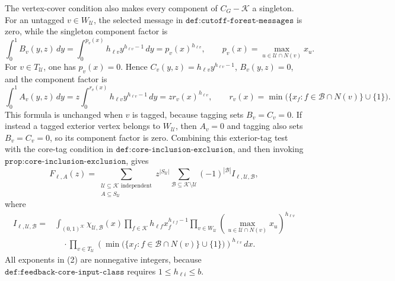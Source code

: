 The vertex-cover condition also makes every component of \(C_G-\mathcal K\) a singleton.  For an untagged \(v\in W_{\mathcal U}\), the selected message in \(\texttt{def:cutoff-forest-messages}\) is zero, while the singleton component factor is
\[
 \int_0^1 B_v(y,z)\,dy
 =\int_0^{p_v(x)}h_{\ell v}y^{h_{\ell v}-1}\,dy
 =p_v(x)^{h_{\ell v}},
 \qquad
 p_v(x)=\max_{u\in\mathcal U\cap N(v)}x_u.
\]
For \(v\in T_{\mathcal U}\), one has \(p_v(x)=0\).  Hence \(C_v(y,z)=h_{\ell v}y^{h_{\ell v}-1}\), \(B_v(y,z)=0\), and the component factor is
\[
 \int_0^1 A_v(y,z)\,dy
 =z\int_0^{r_v(x)}h_{\ell v}y^{h_{\ell v}-1}\,dy
 =z r_v(x)^{h_{\ell v}},
 \qquad
 r_v(x)=\min\bigl(\{x_f:f\in\mathcal B\cap N(v)\}\cup\{1\}\bigr).
\]
This formula is unchanged when \(v\) is tagged, because tagging sets \(B_v=C_v=0\).  If instead a tagged exterior vertex belongs to \(W_{\mathcal U}\), then \(A_v=0\) and tagging also sets \(B_v=C_v=0\), so its component factor is zero.  Combining this exterior-tag test with the core-tag condition in \(\texttt{def:core-inclusion-exclusion}\), and then invoking \(\texttt{prop:core-inclusion-exclusion}\), gives
\[
 F_{\ell,A}(z)
 =\sum_{\substack{\mathcal U\subseteq\mathcal K\text{ independent}\\ A\subseteq S_{\mathcal U}}}
 z^{|S_{\mathcal U}|}
 \sum_{\mathcal B\subseteq\mathcal K\setminus\mathcal U}
 (-1)^{|\mathcal B|} I_{\ell,\mathcal U,\mathcal B},                         \tag{1}
\]
where
\[
\begin{split}
 I_{\ell,\mathcal U,\mathcal B}
 ={}&\int_{(0,1)^{\mathcal K}}
 \chi_{\mathcal U,\mathcal B}(x)
 \prod_{f\in\mathcal K}h_{\ell f}x_f^{h_{\ell f}-1}
 \prod_{v\in W_{\mathcal U}}
 \left(\max_{u\in\mathcal U\cap N(v)}x_u\right)^{h_{\ell v}}\\
 &\quad\cdot
 \prod_{v\in T_{\mathcal U}}
 \left(\min\bigl(\{x_f:f\in\mathcal B\cap N(v)\}\cup\{1\}\bigr)\right)^{h_{\ell v}}\,dx .       \tag{2}
\end{split}
\]
All exponents in (2) are nonnegative integers, because \(\texttt{def:feedback-core-input-class}\) requires \(1\leq h_{\ell i}\leq b\).

